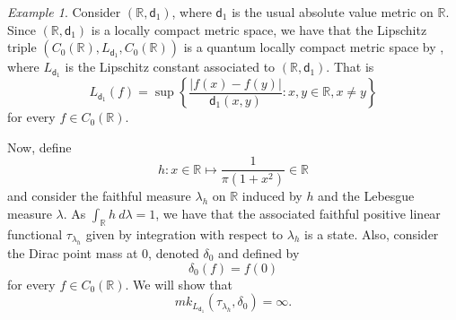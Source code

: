 \documentclass{amsart}
\theoremstyle{plain}
\theoremstyle{definition}
\theoremstyle{remark}
\newtheorem{example}[theorem]{Example}
\numberwithin{equation}{section}
\newcommand{\la}{{\lambda}}
\newcommand{\de}{{\delta}}
\newcommand{\dd}{{\mathsf{d}}}
\newcommand{\R}{{\mathds{R}}}
\begin{document}
\begin{example}\label{e:extended}
    Consider $(\R, \dd_1)$, where $\dd_1$ is the usual absolute value metric on $\R$. Since  $(\R, \dd_1)$ is a locally compact metric space, we have that the Lipschitz triple $(C_0(\R), L_{\dd_1} , C_0(\R))$ is a quantum locally compact metric space by \cite[Theorem 4.1]{Latremoliere12b}, where  $L_{\dd_1}$ is the Lipschitz constant associated to $(\R, \dd_1)$. That is
    \[
    L_{\dd_1}(f)=\sup \left\{\frac{|f(x)-f(y)|}{\dd_1(x,y)} : x,y \in \R,  x\neq y\right\}
    \]
    for every $f\in C_0(\R)$. 


    Now, define
    \[
    h: x\in \R\longmapsto \frac{1}{\pi(1+x^2)}\in \R
    \]
    and consider the faithful measure $\la_h$ on $\R$ induced by $h$ and the Lebesgue measure $\la$. As $\int_\R h\  d \la =1$, we have that the associated faithful positive linear functional $\tau_{\la_h}$ given by integration with respect to $\la_h$ is a state. Also, consider the Dirac point mass at $0$, denoted $\de_0$ and defined by 
    \[
    \de_0(f)=f(0)
    \]
    for every $f\in C_0(\R)$. We will show that 
    \[
    mk_{L_{\dd_1}}(\tau_{\la_h}, \de_0)=\infty.
    \]


\end{example}
\end{document}
